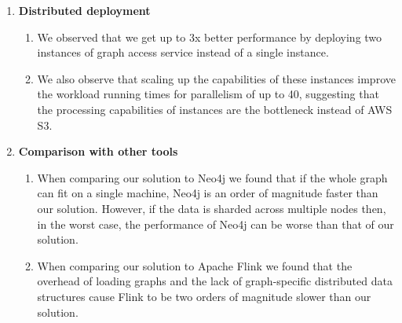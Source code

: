 \begin{enumerate}
\begin{enumerate}
        \end{enumerate}
    \item \textbf{Distributed deployment}
        \begin{enumerate}
            \item We observed that we get up to 3x better performance by
                deploying two instances of graph access service instead of a
                single instance.
            \item We also observe that scaling up the capabilities of these
                instances improve the workload running times for parallelism of
                up to 40, suggesting that the processing capabilities of
                instances are the bottleneck instead of AWS S3. 
        \end{enumerate}
    \item \textbf{Comparison with other tools}
        \begin{enumerate}
            \item When comparing our solution to Neo4j we found that if the
                whole graph can fit on a single machine, Neo4j is an
                order of magnitude faster than our solution. However, if the
                data is sharded across multiple nodes then, in the worst case,
                the performance of Neo4j can be worse than that of our solution.
            \item When comparing our solution to Apache Flink we found that the
                overhead of loading graphs and the lack of graph-specific
                distributed data structures cause Flink to be two orders of
                magnitude slower than our solution.
        \end{enumerate}
\end{enumerate}
